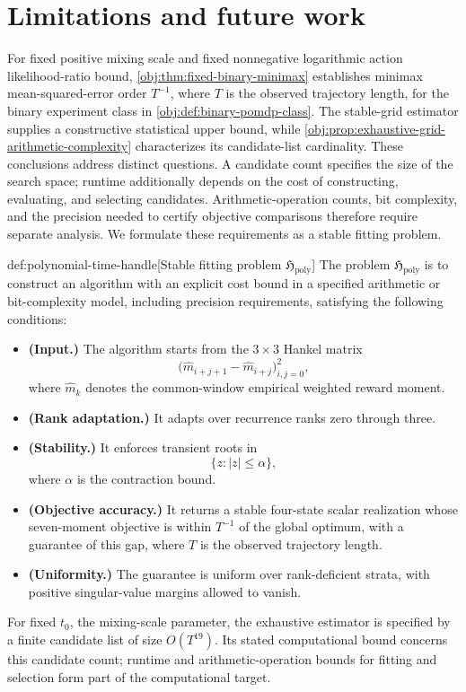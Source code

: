 \section{Limitations and future work}

For fixed positive mixing scale and fixed nonnegative logarithmic action likelihood-ratio bound, \cref{obj:thm:fixed-binary-minimax} establishes minimax mean-squared-error order \(T^{-1}\), where \(T\) is the observed trajectory length, for the binary experiment class in \cref{obj:def:binary-pomdp-class}. The stable-grid estimator supplies a constructive statistical upper bound, while \cref{obj:prop:exhaustive-grid-arithmetic-complexity} characterizes its candidate-list cardinality. These conclusions address distinct questions. A candidate count specifies the size of the search space; runtime additionally depends on the cost of constructing, evaluating, and selecting candidates. Arithmetic-operation counts, bit complexity, and the precision needed to certify objective comparisons therefore require separate analysis. We formulate these requirements as a stable fitting problem.

\begin{definitionv}{def:polynomial-time-handle}[Stable fitting problem \(\mathfrak H_{\mathrm{poly}}\)]
The problem \(\mathfrak H_{\mathrm{poly}}\) is to construct an algorithm with an explicit cost bound in a specified arithmetic or bit-complexity model, including precision requirements, satisfying the following conditions:
\begin{itemize}
\item \textbf{(Input.)} The algorithm starts from the \(3\times3\) Hankel matrix
\[
\bigl(\widehat m_{i+j+1}-\widehat m_{i+j}\bigr)_{i,j=0}^{2},
\]
where \(\widehat m_k\) denotes the common-window empirical weighted reward moment.
\item \textbf{(Rank adaptation.)} It adapts over recurrence ranks zero through three.
\item \textbf{(Stability.)} It enforces transient roots in
\[
\{z:|z|\leq\alpha\},
\]
where \(\alpha\) is the contraction bound.
\item \textbf{(Objective accuracy.)} It returns a stable four-state scalar realization whose seven-moment objective is within \(T^{-1}\) of the global optimum, with a guarantee of this gap, where \(T\) is the observed trajectory length.
\item \textbf{(Uniformity.)} The guarantee is uniform over rank-deficient strata, with positive singular-value margins allowed to vanish.
\end{itemize}
For fixed \(t_0\), the mixing-scale parameter, the exhaustive estimator is specified by a finite candidate list of size \(O(T^{19})\). Its stated computational bound concerns this candidate count; runtime and arithmetic-operation bounds for fitting and selection form part of the computational target.
\end{definitionv}

